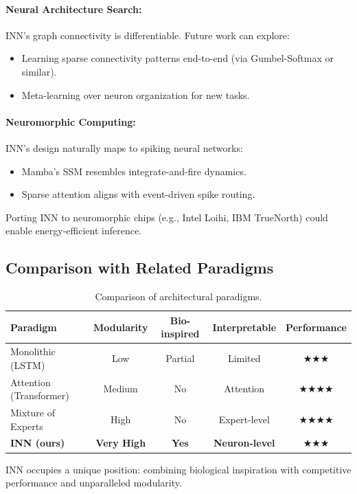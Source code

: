 \documentclass{article}
\begin{document}
\paragraph{Neural Architecture Search:}
INN's graph connectivity is differentiable. Future work can explore:
\begin{itemize}
    \item Learning sparse connectivity patterns end-to-end (via Gumbel-Softmax or similar).
    \item Meta-learning over neuron organization for new tasks.
\end{itemize}

\paragraph{Neuromorphic Computing:}
INN's design naturally maps to spiking neural networks:
\begin{itemize}
    \item Mamba's SSM resembles integrate-and-fire dynamics.
    \item Sparse attention aligns with event-driven spike routing.
\end{itemize}
Porting INN to neuromorphic chips (e.g., Intel Loihi, IBM TrueNorth) could enable energy-efficient inference.

\subsection{Comparison with Related Paradigms}

\begin{table}[h]
\centering
\caption{Comparison of architectural paradigms.}
\begin{tabular}{lcccc}
\toprule
\textbf{Paradigm} & \textbf{Modularity} & \textbf{Bio-inspired} & \textbf{Interpretable} & \textbf{Performance} \\
\midrule
Monolithic (LSTM) & Low & Partial & Limited & ★★★ \\
Attention (Transformer) & Medium & No & Attention & ★★★★ \\
Mixture of Experts & High & No & Expert-level & ★★★★ \\
\textbf{INN (ours)} & \textbf{Very High} & \textbf{Yes} & \textbf{Neuron-level} & ★★★ \\
\bottomrule
\end{tabular}
\end{table}

INN occupies a unique position: combining biological inspiration with competitive performance and unparalleled modularity.
\end{document}
